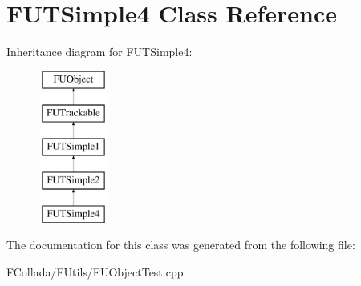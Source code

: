 \hypertarget{classFUTSimple4}{
\section{FUTSimple4 Class Reference}
\label{classFUTSimple4}
}
Inheritance diagram for FUTSimple4:\begin{figure}[H]
\begin{center}
\leavevmode
\includegraphics[height=5.000000cm]{classFUTSimple4}
\end{center}
\end{figure}


The documentation for this class was generated from the following file:\begin{DoxyCompactItemize}
\item 
FCollada/FUtils/FUObjectTest.cpp\end{DoxyCompactItemize}
